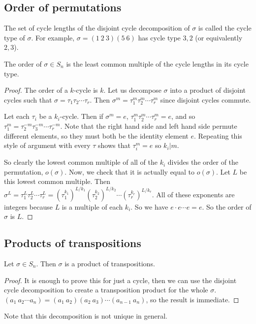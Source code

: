 \subsection{Order of permutations}
The set of cycle lengths of the disjoint cycle decomposition of \(\sigma\) is called the cycle type of \(\sigma\).
For example, \(\sigma = (1\ 2\ 3)(5\ 6)\) has cycle type \(3, 2\) (or equivalently \(2, 3\)).

\begin{theorem}
	The order of \(\sigma \in S_n\) is the least common multiple of the cycle lengths in its cycle type.
\end{theorem}
\begin{proof}
	The order of a \(k\)-cycle is \(k\).
	Let us decompose \(\sigma\) into a product of disjoint cycles such that \(\sigma = \tau_1 \tau_2 \cdots \tau_r\).
	Then \(\sigma^m = \tau_1^m \tau_2^m \cdots \tau_r^m\) since disjoint cycles commute.

	Let each \(\tau_i\) be a \(k_i\)-cycle.
	Then if \(\sigma^m = e\), \(\tau_1^m \tau_2^m \cdots \tau_r^m = e\), and so \(\tau_1^m = \tau_2^{-m} \tau_3^{-m} \cdots \tau_r^{-m}\).
	Note that the right hand side and left hand side permute different elements, so they must both be the identity element \(e\).
	Repeating this style of argument with every \(\tau\) shows that \(\tau_i^m = e\) so \(k_i | m\).

	So clearly the lowest common multiple of all of the \(k_i\) divides the order of the permutation, \(o(\sigma)\).
	Now, we check that it is actually equal to \(o(\sigma)\).
	Let \(L\) be this lowest common multiple.
	Then \(\sigma^L = \tau_1^L \tau_2^L \cdots \tau_r^L = (\tau_1^{k_1})^{L/k_1} (\tau_2^{k_2})^{L/k_2} \cdots (\tau_r^{k_r})^{L/k_r}\).
	All of these exponents are integers because \(L\) is a multiple of each \(k_i\).
	So we have \(e \cdot e \cdots e = e\).
	So the order of \(\sigma\) is \(L\).
\end{proof}

\subsection{Products of transpositions}
\begin{proposition}
	Let \(\sigma \in S_n\).
	Then \(\sigma\) is a product of transpositions.
\end{proposition}
\begin{proof}
	It is enough to prove this for just a cycle, then we can use the disjoint cycle decomposition to create a transposition product for the whole \(\sigma\).
	\((a_1\ a_2\cdots a_n) = (a_1\ a_2)(a_2\ a_3)\cdots(a_{n-1}\ a_n)\), so the result is immediate.
\end{proof}
Note that this decomposition is not unique in general.

